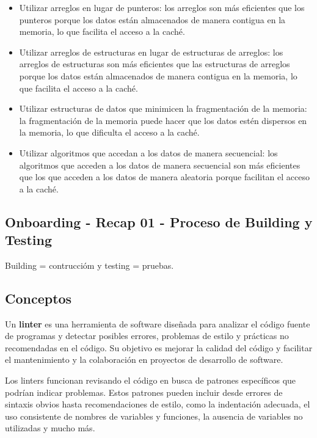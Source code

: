 \documentclass[../main.tex]{subfiles}
\begin{document}
        \begin{itemize}
            \item Utilizar arreglos en lugar de punteros: los arreglos son más eficientes que los punteros porque los datos están almacenados de manera contigua en la memoria, lo que facilita el acceso a la caché.
            \item Utilizar arreglos de estructuras en lugar de estructuras de arreglos: los arreglos de estructuras son más eficientes que las estructuras de arreglos porque los datos están almacenados de manera contigua en la memoria, lo que facilita el acceso a la caché.
            \item Utilizar estructuras de datos que minimicen la fragmentación de la memoria: la fragmentación de la memoria puede hacer que los datos estén dispersos en la memoria, lo que dificulta el acceso a la caché.
            \item Utilizar algoritmos que accedan a los datos de manera secuencial: los algoritmos que acceden a los datos de manera secuencial son más eficientes que los que acceden a los datos de manera aleatoria porque facilitan el acceso a la caché.
        \end{itemize}

    \subsection{Onboarding - Recap 01 - Proceso de Building y Testing}
        Building = contruccióm y testing = pruebas.\\


    \subsection{Conceptos}
        
        Un \textbf{linter} es una herramienta de software diseñada para analizar el código fuente de programas y detectar posibles errores, problemas de estilo y prácticas no recomendadas en el código. Su objetivo es mejorar la calidad del código y facilitar el mantenimiento y la colaboración en proyectos de desarrollo de software.

        Los linters funcionan revisando el código en busca de patrones específicos que podrían indicar problemas. Estos patrones pueden incluir desde errores de sintaxis obvios hasta recomendaciones de estilo, como la indentación adecuada, el uso consistente de nombres de variables y funciones, la ausencia de variables no utilizadas y mucho más.
\end{document}
